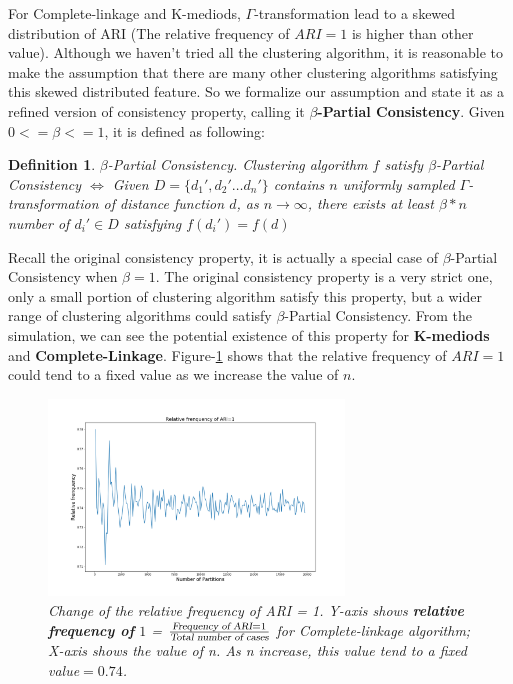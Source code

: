 \documentclass{uonmathreport}
\newtheorem{definition}{Definition}[section]
\begin{document}
For Complete-linkage and K-mediods, $\Gamma$-transformation lead to a skewed distribution of ARI (The relative frequency of $ARI =1$ is higher than other value). Although we haven't tried all the clustering algorithm, it is reasonable to make the assumption that there are many other clustering algorithms satisfying this skewed distributed feature. So we formalize our assumption and state it as a refined version of consistency property, calling it \textbf{$\beta$-Partial Consistency}. 
Given $0<=\beta<=1$, it is defined as following:
\begin{definition}
$\beta $-Partial Consistency. Clustering algorithm $f$ satisfy $\beta$-Partial Consistency $\iff$ Given $D=\{d_1',d_2'\ldots d_n'\}$ contains $n$ uniformly sampled $\Gamma$-transformation of distance function $d$, as $n\rightarrow \infty$, there exists at least $\beta *n$ number of $d_i'\in D$ satisfying $f(d_i')=f(d)$ 
\end{definition}
Recall the original consistency property, it is actually a special case of $\beta $-Partial Consistency when $\beta = 1$. The original consistency property is a very strict one, only a small portion of clustering algorithm satisfy this property, but a wider range of clustering algorithms could satisfy $\beta$-Partial Consistency. From the simulation, we can see the potential existence of this property for \textbf{K-mediods} and \textbf{Complete-Linkage}. Figure-\ref{fig:single-linkage4} shows that the relative frequency of $ARI=1$ could tend to a fixed value as we increase the value of $n$.

\begin{figure}[H]
 \begin{center}
   \includegraphics[width=0.7\textwidth]{convergence.png}
 \end{center}
 \caption{\textit{Change of the relative frequency of ARI = 1. Y-axis shows \textbf{relative frequency of} $1$ = $\frac{\textsl{Frequency of ARI}=1}{\textsl{Total number of cases}} $ for Complete-linkage algorithm; X-axis shows the value of n. As n increase, this value tend to a fixed value$=0.74$.}}
 \label{fig:single-linkage4}
\end{figure}
\end{document}
